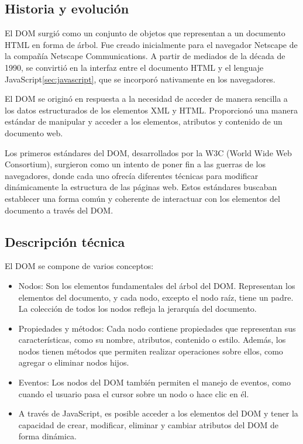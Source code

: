 \documentclass[a4paper, 11pt]{book}
\begin{document}
\subsection{Historia y evolución}
El DOM surgió como un conjunto de objetos que representan a un documento HTML en forma de árbol. Fue creado inicialmente para el navegador Netscape de la compañía Netscape Communications. A partir de mediados de la década de 1990, se convirtió en la interfaz entre el documento HTML y el lenguaje JavaScript\ref{sec:javascript}, que se incorporó nativamente en los navegadores.

El DOM se originó en respuesta a la necesidad de acceder de manera sencilla a los datos estructurados de los elementos XML y HTML. Proporcionó una manera estándar de manipular y acceder a los elementos, atributos y contenido de un documento web.

Los primeros estándares del DOM, desarrollados por la W3C (World Wide Web Consortium), surgieron como un intento de poner fin a las guerras de los navegadores, donde cada uno ofrecía diferentes técnicas para modificar dinámicamente la estructura de las páginas web. Estos estándares buscaban establecer una forma común y coherente de interactuar con los elementos del documento a través del DOM.
\subsection{Descripción técnica}
El DOM se compone de varios conceptos:
\begin{itemize}
    \item Nodos: Son los elementos fundamentales del árbol del DOM. Representan los elementos del documento, y cada nodo, excepto el nodo raíz, tiene un padre. La colección de todos los nodos refleja la jerarquía del documento.
    \item Propiedades y métodos: Cada nodo contiene propiedades que representan sus características, como su nombre, atributos, contenido o estilo. Además, los nodos tienen métodos que permiten realizar operaciones sobre ellos, como agregar o eliminar nodos hijos.
    \item Eventos: Los nodos del DOM también permiten el manejo de eventos, como cuando el usuario pasa el cursor sobre un nodo o hace clic en él.
    \item A través de JavaScript, es posible acceder a los elementos del DOM y tener la capacidad de crear, modificar, eliminar y cambiar atributos del DOM de forma dinámica.
\end{itemize}
\end{document}
